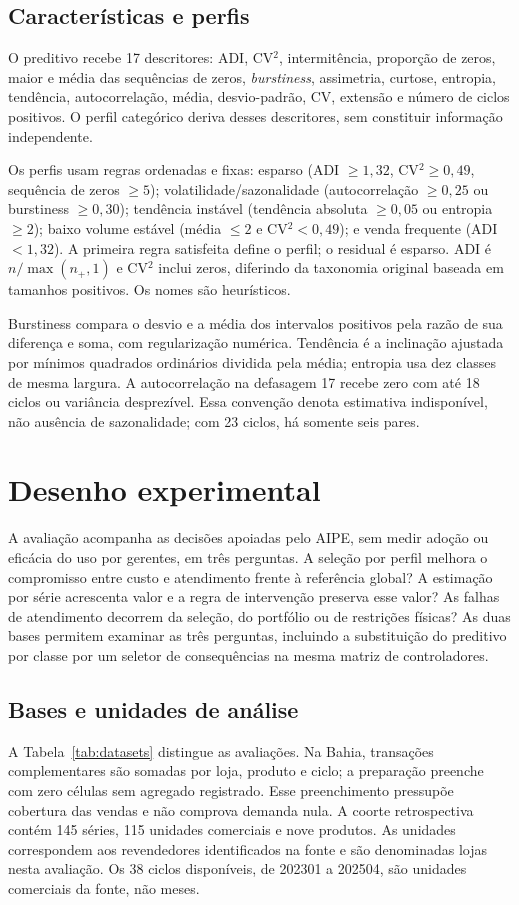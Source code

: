 \documentclass[preprint,12pt]{elsarticle}
\begin{document}
\subsection{Características e perfis}
O preditivo recebe 17 descritores: ADI, CV$^2$, intermitência, proporção de zeros, maior e média das sequências de zeros, \textit{burstiness}, assimetria, curtose, entropia, tendência, autocorrelação, média, desvio-padrão, CV, extensão e número de ciclos positivos. O perfil categórico deriva desses descritores, sem constituir informação independente.

Os perfis usam regras ordenadas e fixas: esparso (ADI $\geq1{,}32$, CV$^2\geq0{,}49$, sequência de zeros $\geq5$); volatilidade/sazonalidade (autocorrelação $\geq0{,}25$ ou burstiness $\geq0{,}30$); tendência instável (tendência absoluta $\geq0{,}05$ ou entropia $\geq2$); baixo volume estável (média $\leq2$ e CV$^2<0{,}49$); e venda frequente (ADI $<1{,}32$). A primeira regra satisfeita define o perfil; o residual é esparso. ADI é $n/\max(n_+,1)$ e CV$^2$ inclui zeros, diferindo da taxonomia original baseada em tamanhos positivos. Os nomes são heurísticos.

Burstiness compara o desvio e a média dos intervalos positivos pela razão de sua diferença e soma, com regularização numérica. Tendência é a inclinação ajustada por mínimos quadrados ordinários dividida pela média; entropia usa dez classes de mesma largura. A autocorrelação na defasagem 17 recebe zero com até 18 ciclos ou variância desprezível. Essa convenção denota estimativa indisponível, não ausência de sazonalidade; com 23 ciclos, há somente seis pares.

\section{Desenho experimental}
A avaliação acompanha as decisões apoiadas pelo AIPE, sem medir adoção ou eficácia do uso por gerentes, em três perguntas. A seleção por perfil melhora o compromisso entre custo e atendimento frente à referência global? A estimação por série acrescenta valor e a regra de intervenção preserva esse valor? As falhas de atendimento decorrem da seleção, do portfólio ou de restrições físicas? As duas bases permitem examinar as três perguntas, incluindo a substituição do preditivo por classe por um seletor de consequências na mesma matriz de controladores.
\subsection{Bases e unidades de análise}
A Tabela~\ref{tab:datasets} distingue as avaliações. Na Bahia, transações complementares são somadas por loja, produto e ciclo; a preparação preenche com zero células sem agregado registrado. Esse preenchimento pressupõe cobertura das vendas e não comprova demanda nula. A coorte retrospectiva contém 145 séries, 115 unidades comerciais e nove produtos. As unidades correspondem aos revendedores identificados na fonte e são denominadas lojas nesta avaliação. Os 38 ciclos disponíveis, de 202301 a 202504, são unidades comerciais da fonte, não meses.
\end{document}

